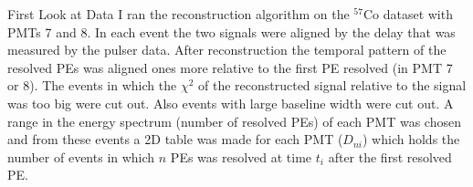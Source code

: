 \documentclass{beamer}
\begin{document}
\begin{frame}{First Look at Data}
I ran the reconstruction algorithm on the $^{57}$Co dataset with PMTs 7 and 8. In each event the two signals were aligned by the delay that was measured by the pulser data. After reconstruction the temporal pattern of the resolved PEs was aligned ones more relative to the first PE resolved (in PMT 7 or 8). The events in which the $\chi^2$ of the reconstructed signal relative to the signal was too big were cut out. Also events with large baseline width were cut out. A range in the energy spectrum (number of resolved PEs) of each PMT was chosen and from these events a 2D table was made for each PMT ($D_{ni}$) which holds the number of events in which $n$ PEs was resolved at time $t_i$ after the first resolved PE.
\end{frame}
\end{document}
